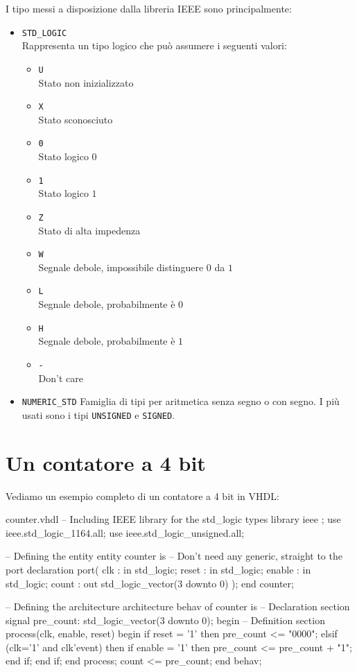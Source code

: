 \documentclass[10pt,a4paper,oneside]{scrbook}
\begin{document}
I tipo messi a disposizione dalla libreria IEEE sono principalmente:
\begin{itemize}
    \item \texttt{STD\_LOGIC}\\
    Rappresenta un tipo logico che può assumere i seguenti valori:
    \begin{itemize}
        \item \texttt{U}\\
        Stato non inizializzato
        \item \texttt{X}\\
        Stato sconosciuto
        \item \texttt{0}\\
        Stato logico $0$
        \item \texttt{1}\\
        Stato logico $1$
        \item \texttt{Z}\\
        Stato di alta impedenza
        \item \texttt{W}\\
        Segnale debole, impossibile distinguere $0$ da $1$
        \item \texttt{L}\\
        Segnale debole, probabilmente è $0$
        \item \texttt{H}\\
        Segnale debole, probabilmente è $1$
        \item \texttt{-}\\
        Don't care
    \end{itemize}
    
   \item \texttt{NUMERIC\_STD}
   Famiglia di tipi per aritmetica senza segno o con segno.
   I più usati sono i tipi \texttt{UNSIGNED} e \texttt{SIGNED}.
\end{itemize}
\newpage
\section{Un contatore a 4 bit}
Vediamo un esempio completo di un contatore a 4 bit in VHDL:
\begin{vhdl}{counter.vhdl}
-- Including IEEE library for the std_logic types
library ieee ;
use ieee.std_logic_1164.all;
use ieee.std_logic_unsigned.all;

-- Defining the entity
entity counter is
    -- Don't need any generic, straight to the port declaration
    port(
        clk     :  in   std_logic;
        reset   :  in   std_logic;
        enable  :  in   std_logic;
        count   :  out  std_logic_vector(3 downto 0)
    );
end counter;

-- Defining the architecture
architecture behav of counter is
    -- Declaration section       
    signal pre_count: std_logic_vector(3 downto 0);
begin
    -- Definition section
    process(clk, enable, reset)
    begin
        if reset = '1' then
            pre_count <= "0000";
        elsif (clk='1' and clk'event) then
            if enable = '1' then
              pre_count <= pre_count + "1";
            end if;
        end if;
    end process;  
    count <= pre_count;
end behav;
\end{vhdl}
\end{document}

